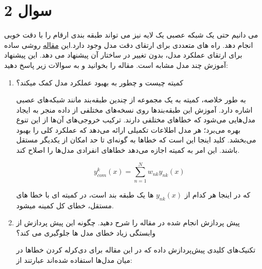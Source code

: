 \section{سوال 2}

می دانیم حتی یک شبکه عصبی یک لایه نیز می تواند طبقه بندی ارقام را با دقت خوبی انجام
دهد. راه های متعددی برای ارتقای دقت مدل وجود دارد.این
\href{http://www.iapr-tc11.org/archive/icdar2011/fileup/PDF/4520b250.pdf}{مقاله}
روشی ساده برای ارتقای عملکرد مدل،
بدون تغییر در ساختار آن پیشنهاد می دهد. این پیشنهاد آموزش چند مدل مشابه است. مقاله را بخوانید و به
سوالات زیر پاسخ دهید:

\begin{enumerate}
	\item {
	      کمیته چیست و چطور به بهبود عملکرد مدل کمک میکند؟

	      \begin{qsolve}[]
		      به طور خلاصه، کمیته به یک مجموعه از چندین طبقه‌بند مانند شبکه‌های عصبی اشاره دارد. آموزش این طبقه‌بندها روی نسخه‌های مختلفی از داده منجر به ایجاد مدل‌هایی می‌شود که خطاهای مختلفی دارند. ترکیب خروجی‌های آن‌ها از این تنوع بهره می‌برد؛ هر مدل اطلاعات تکمیلی ارائه می‌دهد که عملکرد کلی را بهبود می‌بخشد. کلید اینجا این است که خطاها به گونه‌ای تا حد امکان از یکدیگر مستقل باشند. این امر به کمیته اجازه می‌دهد خطاهای انفرادی مدل‌ها را اصلاح کند.

		      \[
			      y_{com}^k(x)=\sum_{n=1}^{N}w_{nk}y_{nk}(x)
		      \]

		      که در اینجا هر کدام از $y_{nk}(x)$ ها یک طبقه بند است، در کمیته ای با خطا های مستقل، خطای کل کمینه میشود.
	      \end{qsolve}
	      }
	\item {
	      پیش پردازش انجام شده در مقاله را شرح دهید. چگونه این پیش پردازش از وابستگی زیاد خطای مدل
	      ها جلوگیری می کند؟

	      \begin{qsolve}[]
		      تکنیک‌های کلیدی پیش‌پردازش داده که در این مقاله برای دی‌کرله کردن خطاها در میان مدل‌ها استفاده شده‌اند عبارتند از:


\end{qsolve}}
\end{enumerate}
